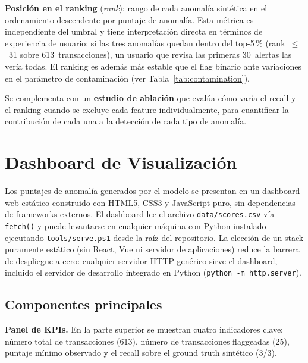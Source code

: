 \documentclass[conference]{IEEEtran}
\begin{document}
\textbf{Posici\'on en el ranking} (\emph{rank}): rango de cada anomal\'ia
sint\'etica en el ordenamiento descendente por puntaje de anomal\'ia. Esta
m\'etrica es independiente del umbral y tiene interpretaci\'on directa en
t\'erminos de experiencia de usuario: si las tres anomal\'ias quedan dentro del
top-5\,\% (rank~$\leq$~31 sobre 613~transacciones), un usuario que revisa las
primeras 30~alertas las ver\'ia todas. El ranking es adem\'as m\'as estable que
el flag binario ante variaciones en el par\'ametro de contaminaci\'on
(ver Tabla~\ref{tab:contamination}).

Se complementa con un \textbf{estudio de ablaci\'on} que eval\'ua c\'omo var\'ia el
recall y el ranking cuando se excluye cada feature individualmente, para cuantificar
la contribuci\'on de cada una a la detecci\'on de cada tipo de anomal\'ia.

\section{Dashboard de Visualizaci\'on}
\label{sec:dashboard}

Los puntajes de anomal\'ia generados por el modelo se presentan en un dashboard web
est\'atico construido con HTML5, CSS3 y JavaScript puro, sin dependencias de
frameworks externos. El dashboard lee el archivo \texttt{data/scores.csv} v\'ia
\texttt{fetch()} y puede levantarse en cualquier m\'aquina con Python instalado
ejecutando \texttt{tools/serve.ps1} desde la ra\'iz del repositorio. La elecci\'on
de un stack puramente est\'atico (sin React, Vue ni servidor de aplicaciones) reduce
la barrera de despliegue a cero: cualquier servidor HTTP gen\'erico sirve el
dashboard, incluido el servidor de desarrollo integrado en Python
(\texttt{python -m http.server}).

\subsection{Componentes principales}

\textbf{Panel de KPIs.}  En la parte superior se muestran cuatro indicadores clave:
n\'umero total de transacciones (613), n\'umero de transacciones flaggeadas (25),
puntaje m\'inimo observado y el recall sobre el ground truth sint\'etico (3/3).
\end{document}
